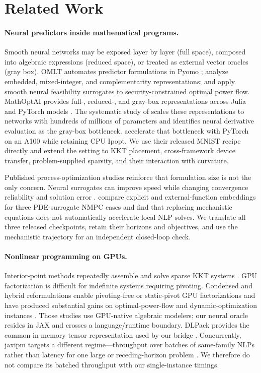 \section{Related Work}
\label{sec:related}

\paragraph{Neural predictors inside mathematical programs.}
Smooth neural networks may be exposed layer by layer (full space), composed
into algebraic expressions (reduced space), or treated as external vector
oracles (gray box).  OMLT automates predictor formulations in Pyomo
\citep{ceccon2022omlt}; \citet{yang2021modeling} analyze embedded,
mixed-integer, and complementarity representations; and
\citet{kilwein2023feasibility} apply smooth neural feasibility surrogates to
security-constrained optimal power flow.  MathOptAI provides full-, reduced-,
and gray-box representations across Julia and PyTorch models
\citep{dowson2025mathoptai}.  The systematic study of
\citet{parker2024formulations} scales these representations to networks with
hundreds of millions of parameters and identifies neural derivative evaluation
as the gray-box bottleneck.  \citet{parker2025gpu} accelerate that bottleneck
with PyTorch on an A100 while retaining CPU Ipopt.  We use their released MNIST
recipe directly and extend the setting to KKT placement, cross-framework
device transfer, problem-supplied sparsity, and their interaction with
curvature.

Published process-optimization studies reinforce that formulation size is not
the only concern.  Neural surrogates can improve speed while changing
convergence reliability and solution error \citep{bugosen2023flowsheet}.
\citet{elorza2025nmpc} compare explicit and external-function embeddings for
three PDE-surrogate NMPC cases and find that replacing mechanistic equations
does not automatically accelerate local NLP solves.  We translate all three
released checkpoints, retain their horizons and objectives, and use the
mechanistic trajectory for an independent closed-loop check.

\paragraph{Nonlinear programming on GPUs.}
Interior-point methods repeatedly assemble and solve sparse KKT systems
\citep{wachter2006ipopt,nocedal2006numerical}.  GPU factorization is difficult
for indefinite systems requiring pivoting.  Condensed and hybrid
reformulations enable pivoting-free or static-pivot GPU factorizations and have
produced substantial gains on optimal-power-flow and dynamic-optimization
instances \citep{shin2024opf,pacaud2024dynamic,pacaud2024condensed}.  Those
studies use GPU-native algebraic modelers; our neural oracle resides in JAX and
crosses a language/runtime boundary.  DLPack provides the common in-memory
tensor representation used by our bridge \citep{dlpack}.  Concurrently,
jaxipm targets a different regime---throughput over batches of same-family NLPs
rather than latency for one large or receding-horizon problem
\citep{viljoen2026jaxipm}.  We therefore do not compare its batched throughput
with our single-instance timings.

